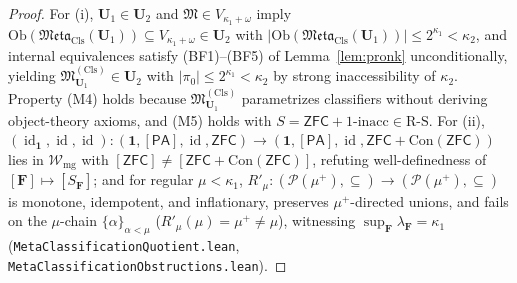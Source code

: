 \documentclass[11pt]{article}
\theoremstyle{plain}
\theoremstyle{definition}
\newcommand{\RS}{\mathrm{R\text{-}S}}
\newcommand{\fM}{\mathfrak{M}}
\newcommand{\Meta}{\mathfrak{Meta}}
\newcommand{\Ob}{\mathrm{Ob}}
\newcommand{\Con}{\mathrm{Con}}
\newcommand{\PA}{\mathsf{PA}}
\newcommand{\ZFC}{\mathsf{ZFC}}
\DeclareMathOperator{\id}{id}
\begin{document}
\begin{proof}
For (i), $\mathbf{U}_1 \in \mathbf{U}_2$ and $\fM \in V_{\kappa_1+\omega}$ imply $\Ob(\Meta_{\mathrm{Cls}}(\mathbf{U}_1)) \subseteq V_{\kappa_1+\omega} \in \mathbf{U}_2$ with $|\Ob(\Meta_{\mathrm{Cls}}(\mathbf{U}_1))| \le 2^{\kappa_1} < \kappa_2$, and internal equivalences satisfy (BF1)--(BF5) of Lemma~\ref{lem:pronk} unconditionally, yielding $\fM^{(\mathrm{Cls})}_{\mathbf{U}_1} \in \mathbf{U}_2$ with $|\pi_0| \le 2^{\kappa_1} < \kappa_2$ by strong inaccessibility of $\kappa_2$. Property (M4) holds because $\fM^{(\mathrm{Cls})}_{\mathbf{U}_1}$ parametrizes classifiers without deriving object-theory axioms, and (M5) holds with $S = \ZFC + 1\text{-inacc} \in \RS$. For (ii), $(\id_{\mathbf{1}}, \id, \id) : (\mathbf{1}, [\PA], \id, \ZFC) \to (\mathbf{1}, [\PA], \id, \ZFC+\Con(\ZFC))$ lies in $\mathcal{W}_{\mathrm{mg}}$ with $[\ZFC] \neq [\ZFC+\Con(\ZFC)]$, refuting well-definedness of $[\mathbf{F}] \mapsto [S_{\mathbf{F}}]$; and for regular $\mu < \kappa_1$, $R'_\mu : (\mathcal{P}(\mu^+), \subseteq) \to (\mathcal{P}(\mu^+), \subseteq)$ is monotone, idempotent, and inflationary, preserves $\mu^+$-directed unions, and fails on the $\mu$-chain $\{\alpha\}_{\alpha < \mu}$ ($R'_\mu(\mu) = \mu^+ \neq \mu$), witnessing $\sup_{\mathbf{F}} \lambda_{\mathbf{F}} = \kappa_1$ (\texttt{MetaClassificationQuotient.lean}, \texttt{MetaClassificationObstructions.lean}).
\end{proof}
\end{document}
